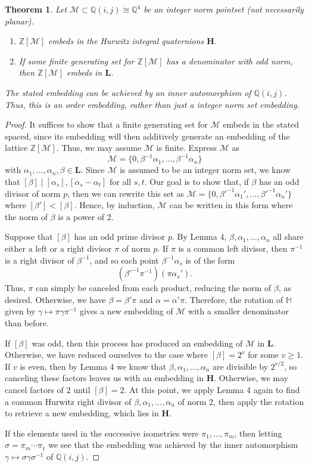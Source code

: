\documentclass[10pt]{amsart}
\newcommand{\M}{\mathcal{M}}
\newcommand{\Q}{\mathbb{Q}}
\newcommand{\Z}{\mathbb{Z}}
\renewcommand{\H}{\mathbb{H}}
\renewcommand{\L}{\mathbf{L}}
\newcommand{\HH}{\mathbf{H}}
\newcommand{\norm}[1]{\left[#1\right]}
\newtheorem{thm}{Theorem}
\begin{document}
\begin{thm} \label{thm:quatemb}
\normalfont
Let $\M \subset \Q(i,j) \cong \Q^4$ be an integer norm pointset (not necessarily planar).
\begin{enumerate}
\item $\Z[\M]$ embeds in the Hurwitz integral quaternions $\HH$.
\item If some finite generating set for $\Z[\M]$ has a denominator with odd norm, then $\Z[\M]$ embeds in $\L$.
\end{enumerate}
The stated embedding can be achieved by an inner automorphism of $\Q(i,j)$.  Thus, this is an order embedding, rather than just a integer norm set embedding.
\end{thm}

\begin{proof}
It suffices to show that a finite generating set for $\M$ embeds in the stated spaced, since its embedding will then additively generate an embedding of the lattice $\Z[\M]$.  Thus, we may assume $\M$ is finite.  Express $\M$ as
$$
\M = \{0, \beta^{-1}\alpha_1, \dots , \beta^{-1}\alpha_n\}
$$
with $\alpha_1, \dots , \alpha_n, \beta \in \L$.  Since $\M$ is assumed to be an integer norm set, we know that $\norm{\beta} \mid \norm{\alpha_s}, \norm{\alpha_s - \alpha_t}$ for all $s,t$.  Our goal is to show that, if $\beta$ has an odd divisor of norm $p$, then we can rewrite this set as $\M = \{0, \beta'^{-1}\alpha_1', \dots , \beta'^{-1}\alpha_n'\}$ where $\norm{\beta'} < \norm{\beta}$.  Hence, by induction, $\M$ can be written in this form where the norm of $\beta$ is a power of 2.

Suppose that $\norm{\beta}$ has an odd prime divisor $p$.  By Lemma 4, $\beta, \alpha_1, \dots , \alpha_n$ all share either a left or a right divisor $\pi$ of norm $p$.  If $\pi$ is a common left divisor, then $\pi^{-1}$ is a right divisor of $\beta^{-1}$, and so each point $\beta^{-1}\alpha_s$ is of the form
$$
(\beta'^{-1} \pi^{-1})(\pi \alpha_s').
$$
Thus, $\pi$ can simply be canceled from each product, reducing the norm of $\beta$, as desired.  Otherwise, we have $\beta = \beta' \pi$ and $\alpha = \alpha' \pi$.  Therefore, the rotation of $\H$ given by $\gamma \mapsto \pi \gamma \pi^{-1}$ gives a new embedding of $\M$ with a smaller denominator than before.

If $\norm{\beta}$ was odd, then this process has produced an embedding of $\M$ in $\L$.  Otherwise, we have reduced ourselves to the case where $\norm{\beta} = 2^v$ for some $v \geq 1$.  If $v$ is even, then by Lemma 4 we know that $\beta, \alpha_1, \dots , \alpha_n$ are divisible by $2^{v/2}$, so canceling these factors leaves us with an embedding in $\HH$.  Otherwise, we may cancel factors of $2$ until $\norm{\beta} = 2$.  At this point, we apply Lemma 4 again to find a common Hurwitz right divisor of $\beta, \alpha_1, \dots , \alpha_n$ of norm $2$, then apply the rotation to retrieve a new embedding, which lies in $\HH$.

If the elements used in the successive isometries were $\pi_1, \dots , \pi_m$, then letting $\sigma = \pi_m \cdots \pi_1$ we see that the embedding was achieved by the inner automorphism $\gamma \mapsto \sigma \gamma \sigma^{-1}$ of $\Q(i,j)$.
\end{proof}
\end{document}
